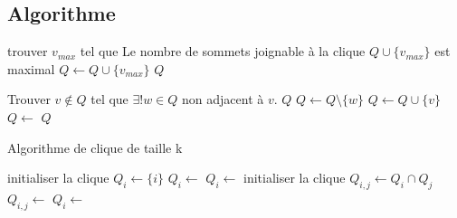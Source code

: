 \documentclass{article}
\begin{document}
\subsection{Algorithme}
\begin{algorithm}
\begin{algorithmic}
    \State trouver $v_{max}$ tel que Le nombre de sommets joignable à la clique $Q \cup \{v_{max}\}$ est maximal
    \State $Q \gets Q\cup \{v_{max}\}$
  \EndWhile
    \State \Return $Q$
  \EndFunction
\end{algorithmic}
\end{algorithm}
\begin{algorithm}
\begin{algorithmic}
  \State Trouver $v \notin Q$ tel que $\exists! w \in Q$ non adjacent à $v$.
      \State \Return $Q$
    \Else
      \State $Q\gets Q \setminus \{w\}$
      \State $Q \gets Q \cup \{v\}$
      \State $Q \gets$ 
      \State \Return $Q$
    \EndIf
  \EndFunction
\end{algorithmic}
\end{algorithm}

\begin{algorithm}[!htp]
\caption{Algorithme de clique de taille k}
\begin{algorithmic}[1]
    \State initialiser la clique $Q_i\gets \{i\}$
    \State $Q_i \gets$ 
      \State $Q_i \gets$ 
    \EndFor
  \EndFor
    \State initialiser la clique $Q_{i,j} \gets Q_i \cap Q_j$
    \State $Q_{i,j} \gets$ 
      \State $Q_i \gets$ 
    \EndFor
  \EndFor

\end{algorithmic}
\end{algorithm}
\end{document}
